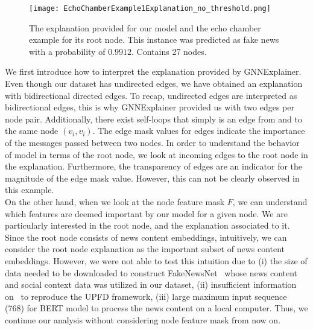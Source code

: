 \begin{figure}
    \centering
    \texttt{[image: EchoChamberExample1Explanation\_no\_threshold.png]}
    \caption[Echo chamber example explanation for root node]{The explanation provided for our model and the echo chamber example for its root node. This instance was predicted as fake news with a probability of $0.9912$. Contains 27 nodes.}
    \label{fig:EchoChamberExample1Explanation_no_threshold}
\end{figure}
We first introduce how to interpret the explanation provided by GNNExplainer. Even though our dataset has undirected edges, we have obtained an explanation with bidirectional directed edges. To recap, undirected edges are interpreted as bidirectional edges, this is why GNNExplainer provided us with two edges per node pair. Additionally, there exist self-loops that simply is an edge from and to the same node $(v_i, v_i)$. The edge mask values for edges indicate the importance of the messages passed between two nodes. In order to understand the behavior of model in terms of the root node, we look at incoming edges to the root node in the explanation. Furthermore, the transparency of edges are an indicator for the magnitude of the edge mask value. However, this can not be clearly observed in this example.\\
On the other hand, when we look at the node feature mask $F$, we can understand which features are deemed important by our model for a given node. We are particularly interested in the root node, and the explanation associated to it. Since the root node consists of news content embeddings, intuitively, we can consider the root node explanation as the important subset of news content embeddings. However, we were not able to test this intuition due to (i) the size of data needed to be downloaded to construct FakeNewsNet~\parencite{FakeNewsNet_Shu} whose news content and social context data was utilized in our dataset, (ii) insufficient information on~\cite{UPFD_Dataset_Shu} to reproduce the UPFD framework, (iii) large maximum input sequence (768) for BERT model to process the news content on a local computer. Thus, we continue our analysis without considering node feature mask from now on. \\
